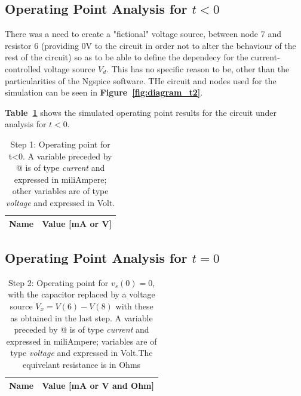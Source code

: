 \subsection{Operating Point Analysis for $t<0$}
There was a need to create a "fictional" voltage source, between node 7 and resistor 6 (providing 0V to the circuit in order not to alter the behaviour of the rest of the circuit) so as to be able to define the dependecy for the current-controlled voltage source {\it $V_d$}. This has no specific reason to be, other than the particularities of the Ngspice software. THe circuit and nodes used for the simulation can be seen in \textbf{Figure~\ref{fig:diagram_t2}}.\par 
\textbf{Table~\ref{tab:op}} shows the simulated operating point results for the circuit
under analysis for $t<0$. 

\begin{table}[h!]
  \centering
  \begin{tabular}{|l|r|}
    \hline    
    {\bf Name} & {\bf Value [mA or V]} \\ \hline
    
  \end{tabular}
  \caption{Step 1: Operating point for t<0. A variable preceded by @ is of type {\em current}
    and expressed in miliAmpere; other variables are of type {\it voltage} and expressed in
    Volt.}
  \label{tab:op}
\end{table}

\pagebreak
\subsection{Operating Point Analysis for $t=0$}

\begin{table}[h!]
  \centering
  \begin{tabular}{|l|r|}
    \hline    
    {\bf Name} & {\bf Value [mA or V and Ohm]} \\ \hline
    
  \end{tabular}
  \caption{Step 2: Operating point for {\it $v_s(0)=0$}, with the capacitor replaced by a voltage source {\it $V_x=V(6)-V(8)$} with these as obtained in the last step. A variable preceded by @ is of type {\em current}
    and expressed in miliAmpere; variables are of type {\it voltage} and expressed in
    Volt.The equivelant resistance is in Ohms}
  \label{tab:opeq}
\end{table}

